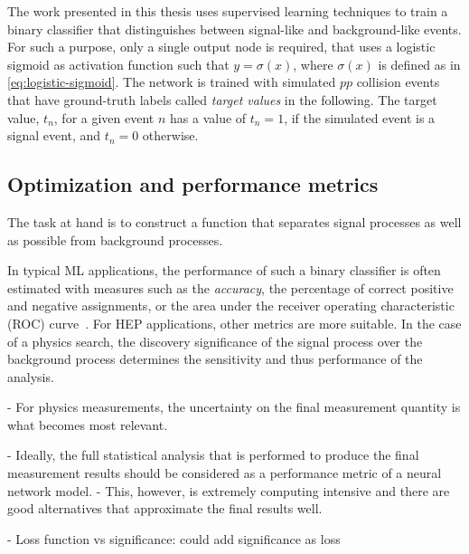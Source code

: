 The work presented in this thesis uses supervised learning techniques to train a binary classifier that distinguishes between signal-like and background-like events. 
For such a purpose, only a single output node is required, that uses a logistic sigmoid as activation function such that $y = \sigma(x)$, where $\sigma(x)$ is defined as in \cref{eq:logistic-sigmoid}.
The network is trained with simulated $pp$ collision events that have ground-truth labels called \emph{target values} in the following. The target value, $t_n$, for a given event $n$ has a value of $t_n = 1$, if the simulated event is a signal event, and $t_n = 0$ otherwise.


\subsection{Optimization and performance metrics}
The task at hand is to construct a function that separates signal processes as well as possible from background processes.


In typical ML applications, the performance of such a binary classifier is often estimated with measures such as the \emph{accuracy}, the percentage of correct positive and negative assignments, or the area under the receiver operating characteristic (ROC) curve~\cite{BRADLEY19971145}. 
For HEP applications, other metrics are more suitable. In the case of a physics search, the discovery significance of the signal process over the background process determines the sensitivity and thus performance of the analysis. 

- For physics measurements, the uncertainty on the final measurement quantity is what becomes most relevant. 

- Ideally, the full statistical analysis that is performed to produce the final measurement results should be considered as a performance metric of a neural network model.
- This, however, is extremely computing intensive and there are good alternatives that approximate the final results well.

- Loss function vs significance: could add significance as loss\cite{ELWOODZ0INML}

